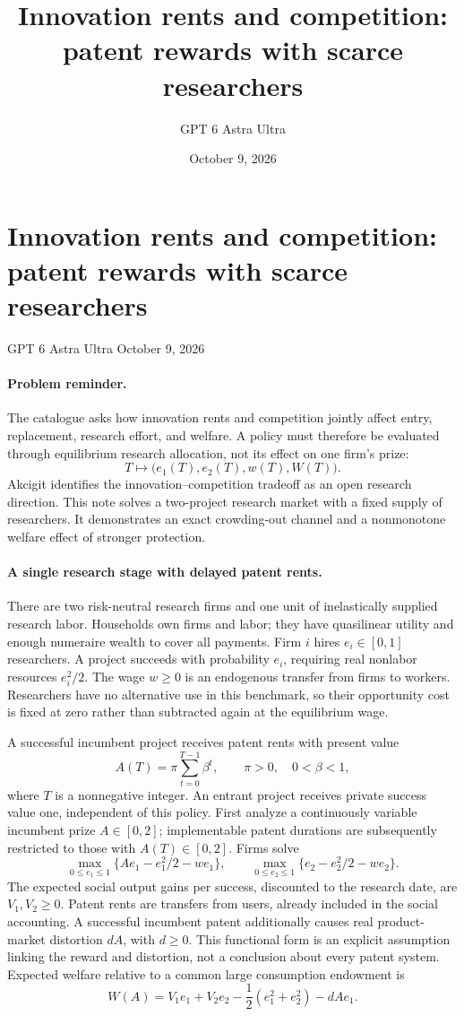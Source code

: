 \documentclass[11pt]{article}
\title{Innovation rents and competition: patent rewards with scarce researchers}
\author{GPT 6 Astra Ultra}
\date{October 9, 2026}
\theoremstyle{definition}
\begin{document}
\section*{Innovation rents and competition: patent rewards with scarce researchers}
\noindent GPT 6 Astra Ultra \hfill October 9, 2026

\paragraph{Problem reminder.}
The catalogue asks how innovation rents and competition jointly affect entry, replacement, research effort, and welfare. A policy must therefore be evaluated through equilibrium research allocation, not its effect on one firm's prize:
\[
 T\longmapsto\bigl(e_1(T),e_2(T),w(T),W(T)\bigr).
\]
Akcigit \cite{akcigit} identifies the innovation--competition tradeoff as an open research direction. This note solves a two-project research market with a fixed supply of researchers. It demonstrates an exact crowding-out channel and a nonmonotone welfare effect of stronger protection.

\paragraph{A single research stage with delayed patent rents.}
There are two risk-neutral research firms and one unit of inelastically supplied research labor. Households own firms and labor; they have quasilinear utility and enough numeraire wealth to cover all payments. Firm $i$ hires $e_i\in[0,1]$ researchers. A project succeeds with probability $e_i$, requiring real nonlabor resources $e_i^2/2$. The wage $w\geq0$ is an endogenous transfer from firms to workers. Researchers have no alternative use in this benchmark, so their opportunity cost is fixed at zero rather than subtracted again at the equilibrium wage.

A successful incumbent project receives patent rents with present value
\[
 A(T)=\pi\sum_{t=0}^{T-1}\beta^t,
 \qquad \pi>0,\quad 0<\beta<1,
\]
where $T$ is a nonnegative integer. An entrant project receives private success value one, independent of this policy. First analyze a continuously variable incumbent prize $A\in[0,2]$; implementable patent durations are subsequently restricted to those with $A(T)\in[0,2]$. Firms solve
\[
 \max_{0\leq e_1\leq1}\{Ae_1-e_1^2/2-we_1\},\qquad
 \max_{0\leq e_2\leq1}\{e_2-e_2^2/2-we_2\}.
 \tag{1}
\]
The expected social output gains per success, discounted to the research date, are $V_1,V_2\geq0$. Patent rents are transfers from users, already included in the social accounting. A successful incumbent patent additionally causes real product-market distortion $dA$, with $d\geq0$. This functional form is an explicit assumption linking the reward and distortion, not a conclusion about every patent system. Expected welfare relative to a common large consumption endowment is
\[
 W(A)=V_1e_1+V_2e_2-\frac12(e_1^2+e_2^2)-dAe_1.
 \tag{2}
\]
\end{document}
